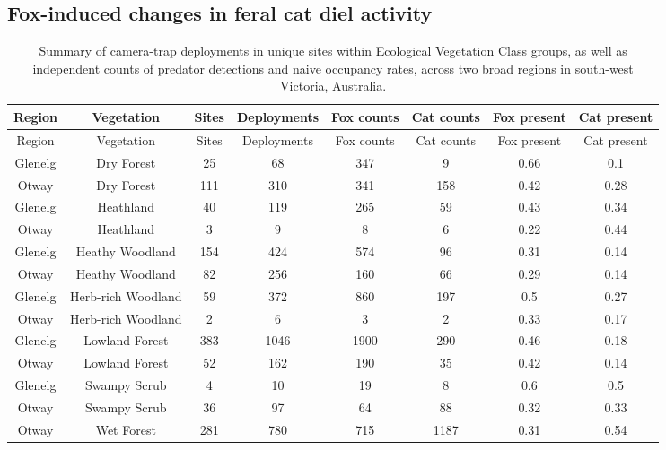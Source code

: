 \documentclass[]{elsarticle} %
\begin{document}
\hypertarget{fox-induced-changes-in-feral-cat-diel-activity}{%
\subsection{Fox-induced changes in feral cat diel activity}\label{fox-induced-changes-in-feral-cat-diel-activity}}

\newpage

\begin{longtable}[]{@{}cccccccc@{}}
\caption{Summary of camera-trap deployments in unique sites within Ecological Vegetation Class groups, as well as independent counts of predator detections and naive occupancy rates, across two broad regions in south-west Victoria, Australia.}\tabularnewline
\toprule
Region & Vegetation & Sites & Deployments & Fox counts & Cat counts & Fox present & Cat present\tabularnewline
\midrule
\endfirsthead
\toprule
Region & Vegetation & Sites & Deployments & Fox counts & Cat counts & Fox present & Cat present\tabularnewline
\midrule
\endhead
Glenelg & Dry Forest & 25 & 68 & 347 & 9 & 0.66 & 0.1\tabularnewline
Otway & Dry Forest & 111 & 310 & 341 & 158 & 0.42 & 0.28\tabularnewline
Glenelg & Heathland & 40 & 119 & 265 & 59 & 0.43 & 0.34\tabularnewline
Otway & Heathland & 3 & 9 & 8 & 6 & 0.22 & 0.44\tabularnewline
Glenelg & Heathy Woodland & 154 & 424 & 574 & 96 & 0.31 & 0.14\tabularnewline
Otway & Heathy Woodland & 82 & 256 & 160 & 66 & 0.29 & 0.14\tabularnewline
Glenelg & Herb-rich Woodland & 59 & 372 & 860 & 197 & 0.5 & 0.27\tabularnewline
Otway & Herb-rich Woodland & 2 & 6 & 3 & 2 & 0.33 & 0.17\tabularnewline
Glenelg & Lowland Forest & 383 & 1046 & 1900 & 290 & 0.46 & 0.18\tabularnewline
Otway & Lowland Forest & 52 & 162 & 190 & 35 & 0.42 & 0.14\tabularnewline
Glenelg & Swampy Scrub & 4 & 10 & 19 & 8 & 0.6 & 0.5\tabularnewline
Otway & Swampy Scrub & 36 & 97 & 64 & 88 & 0.32 & 0.33\tabularnewline
Otway & Wet Forest & 281 & 780 & 715 & 1187 & 0.31 & 0.54\tabularnewline
\bottomrule
\end{longtable}

\newpage
\end{document}

